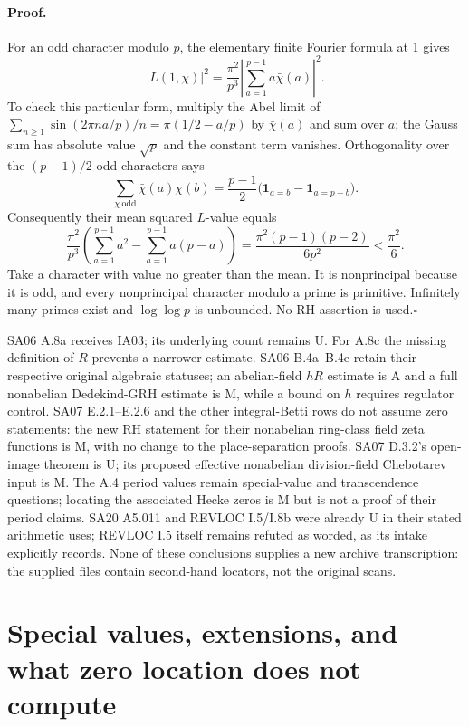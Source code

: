 \documentclass[11pt,a4paper]{article}
\theoremstyle{definition}
\begin{document}
\paragraph{Proof.}
For an odd character modulo $p$, the elementary finite Fourier
formula at 1 gives
\[
 |L(1,\chi)|^2=\frac{\pi^2}{p^3}
              \left|\sum_{a=1}^{p-1}a\bar\chi(a)\right|^2.
\]
To check this particular form, multiply the Abel limit of
$\sum_{n\geq1}\sin(2\pi na/p)/n=\pi(1/2-a/p)$ by
$\bar\chi(a)$ and sum over $a$; the Gauss sum has absolute value
$\sqrt p$ and the constant term vanishes.  Orthogonality over the
$(p-1)/2$ odd characters says
\[
 \sum_{\chi\ {\mathrm{odd}}}\bar\chi(a)\chi(b)
       =\frac{p-1}{2}\bigl(\mathbf1_{a=b}-\mathbf1_{a=p-b}\bigr).
\]
Consequently their mean squared $L$-value equals
\[
 \frac{\pi^2}{p^3}
 \left(\sum_{a=1}^{p-1}a^2-\sum_{a=1}^{p-1}a(p-a)\right)
       =\frac{\pi^2(p-1)(p-2)}{6p^2}<\frac{\pi^2}{6}.
\]
Take a character with value no greater than the mean.  It is
nonprincipal because it is odd, and every nonprincipal character
modulo a prime is primitive.  Infinitely many primes exist and
$\log\log p$ is unbounded.  No RH assertion is used.\hfill$\square$

SA06 A.8a receives IA03; its underlying count remains U.  For A.8c
the missing definition of $R$ prevents a narrower estimate.  SA06
B.4a--B.4e retain their respective original algebraic statuses; an
abelian-field $hR$ estimate is A and a full nonabelian Dedekind-GRH
estimate is M, while a bound on $h$ requires regulator control.
SA07 E.2.1--E.2.6 and the other integral-Betti rows do not assume
zero statements: the new RH statement for their nonabelian ring-class
field zeta functions is M, with no change to the place-separation
proofs.  SA07 D.3.2's open-image theorem is U; its proposed effective
nonabelian division-field Chebotarev input is M.  The A.4 period
values remain special-value and transcendence questions; locating
the associated Hecke zeros is M but is not a proof of their period
claims.  SA20 A5.011 and REVLOC I.5/I.8b were already U in their
stated arithmetic uses; REVLOC I.5 itself remains refuted as worded,
as its intake explicitly records.  None of these conclusions supplies a new
archive transcription: the supplied files contain second-hand
locators, not the original scans.


\section{Special values, extensions, and what zero location does not compute}
\label{sec:special-values}
\end{document}
